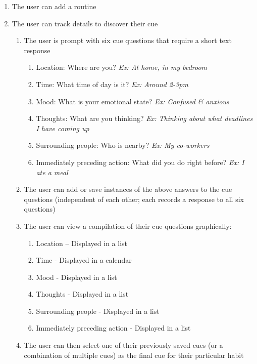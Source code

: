     \begin{enumerate}
        \item The user can add a routine
        \item The user can track details to discover their cue 
            \begin{enumerate}
                \item The user is prompt with six cue questions that require a short text response
                    \begin{enumerate}
                        \item Location: Where are you? \textit{Ex: At home, in my bedroom}
                        \item Time: What time of day is it? \textit{Ex: Around 2-3pm}
                        \item Mood: What is your emotional state? \textit{Ex: Confused \& anxious}
                        \item Thoughts: What are you thinking? \textit{Ex: Thinking about what deadlines I have coming up}
                        \item Surrounding people: Who is nearby? \textit{Ex: My co-workers}
                        \item Immediately preceding action: What did you do right before? \textit{Ex: I ate a meal}
                    \end{enumerate}
                \item The user can add or save instances of the above answers to the cue questions (independent of each other; each records a response to all six questions)
                \item The user can view a compilation of their cue questions graphically:
                    \begin{enumerate}
                        \item Location – Displayed in a list
                        \item Time - Displayed in a calendar
                        \item Mood - Displayed in a list
                        \item Thoughts - Displayed in a list
                        \item Surrounding people - Displayed in a list
                        \item Immediately preceding action - Displayed in a list
                    \end{enumerate}
                \item The user can then select one of their previously saved cues (or a combination of multiple cues) as the final cue for their particular habit

\end{enumerate}
\end{enumerate}
